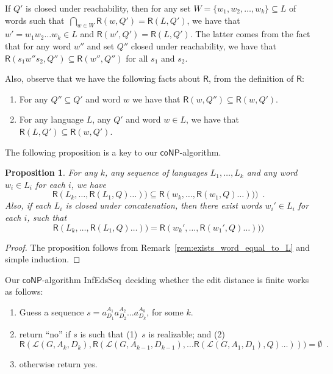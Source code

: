 \documentclass{CSML}
\newcommand{\coNP}{\textsf{coNP}}
\newcommand{\lang}{\mathcal{L}}
\newcommand{\R}{\textsf{R}}
\newcommand{\algoFEDPDADFA}{\textsf{InfEdsSeq}}
\newtheorem{proposition}[theorem]{Proposition}
\begin{document}
\begin{rem}\label{rem:R_set}
 If $Q'$ is closed under reachability, then for any set
 $W=\{w_1,w_2,\dots,w_k\}\subseteq L$ of words such that~$\bigcap_{w \in W} \R(w, Q')=\R(L,Q')$, we have that $w'=w_1w_2\dots w_k\in L$ and  $\R(w',Q')=\R(L,Q')$. The latter comes from the fact that for any word $w''$ and set $Q''$ closed under reachability, we have that $\R(s_1w''s_2,Q'')\subseteq \R(w'',Q'')$ for all $s_1$ and $s_2$. 
 
Also, observe that we have the following facts about $\R$, from the definition of $\R$:
\begin{enumerate}
\item For any $Q''\subseteq Q'$ and word $w$ we have that $\R(w,Q'')\subseteq \R(w,Q')$.
\item For any language $L$, any $Q'$ and word $w\in L$, we have that $\R(L,Q')\subseteq \R(w,Q')$.
\end{enumerate}
  \label{rem:exists_word_equal_to_L}
\end{rem}

The following proposition is a key to our $\coNP$-algorithm.

\begin{proposition}\label{pro:language_to_words}
For any $k$, any sequence of languages $L_1,\dots,L_k$ and any word $w_i\in L_i$ for each $i$, we have 
\[
\R(L_k,  \ldots, \R(L_1, Q) \ldots )) \subseteq \R(w_k, \ldots, \R(w_1, Q) \ldots ))) \enspace .
\]
Also, if each $L_i$ is closed under concatenation, then there exist words $w_i'\in L_i$ for each $i$, such that
\[
\R(L_k,  \ldots, \R(L_1, Q) \ldots )) = \R(w_k', \ldots, \R(w_1', Q) \ldots )))
\]
\end{proposition}
\begin{proof}

The proposition 
follows from Remark~\ref{rem:exists_word_equal_to_L} and simple induction.
\end{proof}


\smallskip\noindent{\bf $\mathbold{\coNP}$-upper bound algorithm.} 
Our $\coNP$-algorithm \algoFEDPDADFA\ deciding whether the edit distance is finite works as follows:
\begin{enumerate}
\item Guess a sequence $s=a_{D_1}^{A_1}a_{D_2}^{A_2}\dots a_{D_k}^{A_k}$, for some $k$.
\item return ``no'' if $s$ is such that (1)~$s$ is realizable; and (2) \[\R(\lang(G,A_k,D_k), \R(\lang(G,A_{k-1},D_{k-1}),  \ldots \R(\lang(G,A_1,D_1), Q) \ldots ))) = \emptyset\enspace .\]
\item otherwise return yes.
\end{enumerate}
\end{document}
